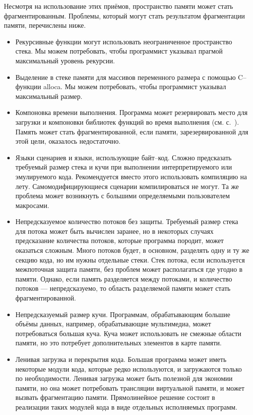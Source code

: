 \documentclass[forwardcom.tex]{subfiles}
\begin{document}
Несмотря на использование этих приёмов, пространство памяти может стать фрагментированным. Проблемы, который могут стать результатом фрагментации памяти, перечислены ниже.
\begin{itemize}
\item Рекурсивные функции могут использовать неограниченное пространство стека. Мы можем потребовать, чтобы программист указывал прагмой максимальный уровень рекурсии.

\item Выделение в стеке памяти для массивов переменного размера с помощью C--функции alloca. Мы можем потребовать, чтобы программист указывал максимальный размер.

\item Компоновка времени выполнения. Программа может резервировать место для загрузки и компоновки библиотек функций во время выполнения (см. с.~\pageref{runtimeLinking}). Память может стать фрагментированной, если памяти, зарезервированной для этой цели, оказалось недостаточно.

\item Языки сценариев и языки, использующие байт--код.  Сложно предсказать требуемый размер стека и кучи при выполнении интерпретируемого или эмулируемого кода. Рекомендуется вместо этого использовать компиляцию \glqq на лету\grqq. Самомодифицирующиеся сценарии компилироваться не могут. Та же проблема может возникнуть с большими определяемыми пользователем макросами.

\item Непредсказуемое количество потоков без защиты. Требуемый размер стека для потока может быть вычислен заранее, но в некоторых случаях предсказание количества потоков, которые программа породит, может оказаться сложным. Много потоков будет, в основном, разделять одну и ту же секцию кода, но им нужны отдельные стеки. Стек потока, если используется межпоточная защита памяти, без проблем может располагаться где угодно в памяти.
Однако, если память разделяется между потоками, и количество потоков --- непредсказуемо, то область разделяемой памяти может стать фрагментированной.

\item Непредсказуемый размер кучи. Программам, обрабатывающим большие объёмы данных, например, обрабатывающие мультимедиа, может потребоваться большая куча. Куча может использовать не смежные области памяти, но это потребует дополнительных элементов в карте памяти.

\item Ленивая загрузка и перекрытия кода. Большая программа может иметь некоторые модули кода, которые редко используются, и загружаются только по необходимости. Ленивая загрузка может быть полезной для экономии памяти, но она может потребовать трансляции виртуальной памяти, и может вызвать фрагментацию памяти. Прямолинейное решение состоит в реализации таких модулей кода в виде отдельных исполняемых программ. 


\end{itemize}
\end{document}
